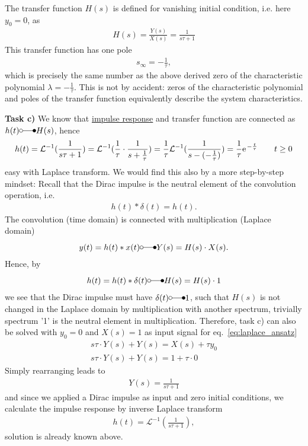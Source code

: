 \documentclass[11pt,a4paper,DIV=12]{scrartcl}
\begin{document}
The transfer function $H(s)$ is defined for vanishing initial condition, i.e. here $y_0=0$, as
\begin{align}
H(s) = \frac{Y(s)}{X(s)} = \frac{1}{s \tau + 1}
\end{align}
This transfer function has one pole
\begin{align}
s_\infty = -\frac{1}{\tau},
\end{align}
which is precisely the same number as the above derived zero of the characteristic polynomial $\lambda=-\frac{1}{\tau}$.
This is not by accident: zeros of the characteristic polynomial and poles of the transfer function equivalently describe the system characteristics.

\textbf{Task c)} We know that \underline{impulse response} and transfer function are connected as $h(t) \laplace H(s)$, hence
\begin{align}
h(t) = \mathcal{L}^{-1}(\frac{1}{s \tau + 1}) = \mathcal{L}^{-1}(\frac{1}{\tau}\cdot\frac{1}{s + \frac{1}{\tau}})=
\frac{1}{\tau}\mathcal{L}^{-1}(\frac{1}{s -  (-\frac{1}{\tau})}) = \frac{1}{\tau}\e^{-\frac{t}{\tau}} \qquad t \geq 0
\end{align}
easy with Laplace transform.
%
We would find this also by a more step-by-step mindset:
Recall that the Dirac impulse is the neutral element of the convolution operation, i.e.
\begin{align}
h(t) \ast \delta(t) = h(t).
\end{align}
The convolution (time domain) is connected with multiplication (Laplace domain)
\begin{align}
y(t) = h(t) \ast x(t) \laplace Y(s) = H(s) \cdot X(s).
\end{align}
Hence, by
\begin{align}
h(t) = h(t)\ast \delta(t)	 \laplace H(s) = H(s) \cdot 1
\end{align}
we see that the Dirac impulse must have $\delta(t) \laplace 1$,
such that $H(s)$ is not changed in the Laplace domain by multiplication with another spectrum, trivially spectrum '1' is the neutral element in multiplication.
%
Therefore, task c) can also be solved with $y_0=0$ and $X(s)=1$ as input signal for eq.~\eqref{eq:laplace_ansatz}
\begin{align}
s \tau \cdot Y(s) + Y(s) = X(s) + \tau y_0\\
s \tau \cdot Y(s) + Y(s) = 1 + \tau \cdot 0
\end{align}
Simply rearranging leads to
\begin{align}
Y(s) = \frac{1}{s \tau + 1}
\end{align}
and since we applied a Dirac impulse as input and zero initial conditions, we
calculate the impulse response by inverse Laplace transform
\begin{align}
h(t) = \mathcal{L}^{-1}(\frac{1}{s \tau + 1}),
\end{align}
solution is already known above.
\end{document}
